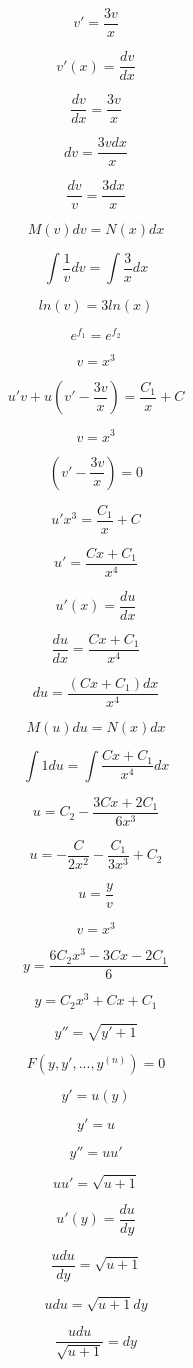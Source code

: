 \documentclass{article}
\begin{document}
$$v' = \frac{3v}{x}$$

$$v'(x) = \frac{dv}{dx}$$

$$\frac{dv}{dx} = \frac{3v}{x}$$

$$dv = \frac{3vdx}{x}$$

$$\frac{dv}{v} = \frac{3dx}{x}$$

$$M(v)dv = N(x)dx$$

$$\int \frac{1}{v}dv = \int \frac{3}{x}dx$$

$$ln(v) = 3ln(x)$$

$$e^{f_1} = e^{f_2}$$

$$v = x^3$$

$$u'v + u(v' - \frac{3v}{x}) = \frac{C_1}{x} + C$$

$$v = x^3$$

$$(v' - \frac{3v}{x}) = 0$$

$$u'x^3 = \frac{C_1}{x} + C$$

$$u' = \frac{Cx + C_1}{x^4}$$

$$u'(x) = \frac{du}{dx}$$

$$\frac{du}{dx} = \frac{Cx + C_1}{x^4}$$

$$du = \frac{(Cx + C_1)dx}{x^4}$$

$$M(u)du = N(x)dx$$

$$\int 1 du = \int \frac{Cx + C_1}{x^4}dx$$

$$u = C_2 - \frac{3Cx + 2C_1}{6x^3}$$

$$u = -\frac{C}{2x^2} - \frac{C_1}{3x^3} + C_2$$

$$u = \frac{y}{v}$$

$$v = x^3$$

$$y = \frac{6C_2x^3 - 3Cx - 2C_1}{6}$$

$$y = C_2x^3 + Cx + C_1$$

\begin{center}
\end{center}
$$y'' = \sqrt{
y' + 1
}$$

$$F(y, y', ..., y^{(n)}) = 0$$

$$y' = u(y)$$

$$y' = u$$

$$y'' = uu'$$

$$uu' = \sqrt{
u  + 1
}$$

$$u'(y) = \frac{du}{dy}$$

$$\frac{udu}{dy} = \sqrt{
u + 1
}$$

$$udu = \sqrt{
u + 1
}dy$$

$$\frac{udu}{\sqrt{u + 1}} = dy$$
\end{document}
